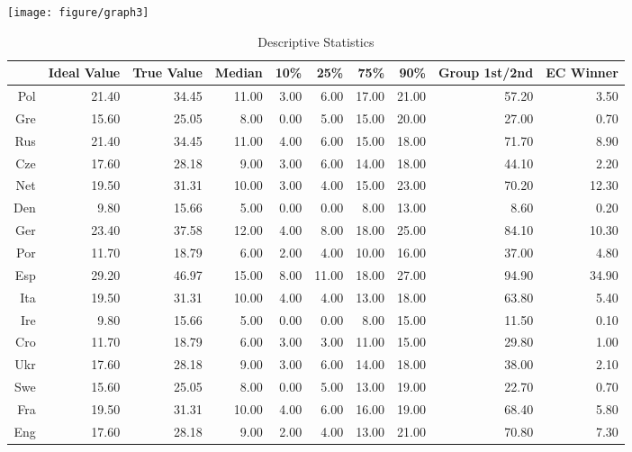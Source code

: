 \documentclass{article}\usepackage[]{graphicx}\usepackage[]{color}
\makeatletter
\def\maxwidth{ %
  \ifdim\Gin@nat@width>\linewidth
    \linewidth
  \else
    \Gin@nat@width
  \fi
}
\newenvironment{knitrout}{}{} %
\makeatother
\begin{document}
\begin{center}

\begin{knitrout}
\color{fgcolor}
\texttt{[image: figure/graph3]} 

\end{knitrout}


\begin{table}[ht]
\centering
{\scriptsize
\begin{tabular}{rrrrrrrrrr}
  \hline
 & Ideal Value & True Value & Median & 10\% & 25\% & 75\% & 90\% & Group 1st/2nd & EC Winner \\ 
  \hline
Pol & 21.40 & 34.45 & 11.00 & 3.00 & 6.00 & 17.00 & 21.00 & 57.20 & 3.50 \\ 
  Gre & 15.60 & 25.05 & 8.00 & 0.00 & 5.00 & 15.00 & 20.00 & 27.00 & 0.70 \\ 
  Rus & 21.40 & 34.45 & 11.00 & 4.00 & 6.00 & 15.00 & 18.00 & 71.70 & 8.90 \\ 
  Cze & 17.60 & 28.18 & 9.00 & 3.00 & 6.00 & 14.00 & 18.00 & 44.10 & 2.20 \\ 
  Net & 19.50 & 31.31 & 10.00 & 3.00 & 4.00 & 15.00 & 23.00 & 70.20 & 12.30 \\ 
  Den & 9.80 & 15.66 & 5.00 & 0.00 & 0.00 & 8.00 & 13.00 & 8.60 & 0.20 \\ 
  Ger & 23.40 & 37.58 & 12.00 & 4.00 & 8.00 & 18.00 & 25.00 & 84.10 & 10.30 \\ 
  Por & 11.70 & 18.79 & 6.00 & 2.00 & 4.00 & 10.00 & 16.00 & 37.00 & 4.80 \\ 
  Esp & 29.20 & 46.97 & 15.00 & 8.00 & 11.00 & 18.00 & 27.00 & 94.90 & 34.90 \\ 
  Ita & 19.50 & 31.31 & 10.00 & 4.00 & 4.00 & 13.00 & 18.00 & 63.80 & 5.40 \\ 
  Ire & 9.80 & 15.66 & 5.00 & 0.00 & 0.00 & 8.00 & 15.00 & 11.50 & 0.10 \\ 
  Cro & 11.70 & 18.79 & 6.00 & 3.00 & 3.00 & 11.00 & 15.00 & 29.80 & 1.00 \\ 
  Ukr & 17.60 & 28.18 & 9.00 & 3.00 & 6.00 & 14.00 & 18.00 & 38.00 & 2.10 \\ 
  Swe & 15.60 & 25.05 & 8.00 & 0.00 & 5.00 & 13.00 & 19.00 & 22.70 & 0.70 \\ 
  Fra & 19.50 & 31.31 & 10.00 & 4.00 & 6.00 & 16.00 & 19.00 & 68.40 & 5.80 \\ 
  Eng & 17.60 & 28.18 & 9.00 & 2.00 & 4.00 & 13.00 & 21.00 & 70.80 & 7.30 \\ 
   \hline
\end{tabular}
}
\caption{Descriptive Statistics} 
\end{table}



\end{center}
\newpage
\end{document}
